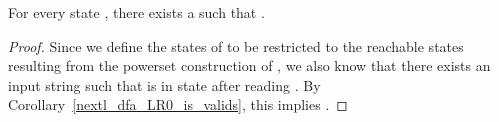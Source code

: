\begin{isabellebody}
\begin{isamarkuptext}
\begin{lemma}\label{state_imp_valids}
For every state , there exists a  such that 
.
\begin{proof}
Since we define the states of  to be restricted to the reachable states resulting 
from the powerset construction of , we also know that there exists an input string \isa{{\isasymgamma}} 
such that  is in state  after reading \isa{{\isasymgamma}}. By Corollary~\ref{nextl_dfa_LR0_is_valids},
this implies .
\end{proof}
\end{lemma}


\end{isamarkuptext}
\end{isabellebody}
